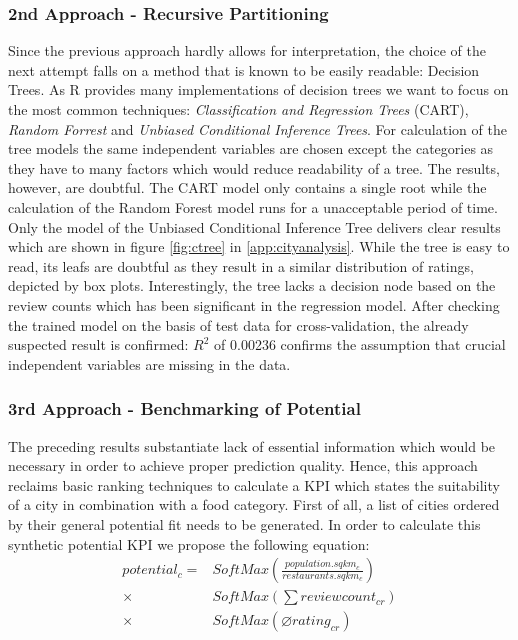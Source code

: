 \subsubsection{2nd Approach - Recursive Partitioning}
Since the previous approach hardly allows for interpretation, the choice of the next attempt falls on a method that is known to be easily readable: Decision Trees. As R provides many implementations of decision trees we want to focus on the most common techniques: \textit{Classification and Regression Trees} (CART), \textit{Random Forrest} and \textit{Unbiased Conditional Inference Trees}.\newline
For calculation of the tree models the same independent variables are chosen except the categories as they have to many factors which would reduce readability of a tree. The results, however, are doubtful. The CART model only contains a single root while the calculation of the Random Forest model runs for a unacceptable period of time. Only the model of the Unbiased Conditional Inference Tree delivers clear results which are shown in figure \ref{fig:ctree} in \ref{app:cityanalysis}.
While the tree is easy to read, its leafs are doubtful as they result in a similar distribution of ratings, depicted by box plots.
Interestingly, the tree lacks a decision node based on the review counts which has been significant in the regression model.
After checking the trained model on the basis of test data for cross-validation, the already suspected result is confirmed: $R^2$ of 0.00236 confirms the assumption that crucial independent variables are missing in the data.

\subsubsection{3rd Approach - Benchmarking of Potential}
\label{subsubsec:potential}
The preceding results substantiate lack of essential information which would be necessary in order to achieve proper prediction quality. Hence, this approach reclaims basic ranking techniques to calculate a \ac{KPI} which states the suitability of a city in combination with a food category.\newline
First of all, a list of cities ordered by their general potential fit needs to be generated. In order to calculate this synthetic potential \ac{KPI}  we propose the following equation:
\begin{equation}
\begin{aligned}
	potential_c = &SoftMax(\frac{population.sqkm_c}{restaurants.sqkm_c})  \\
	\times & SoftMax(\textstyle \sum reviewcount_{cr})  \\
	\times & SoftMax(\varnothing rating_{cr}) %
\end{aligned}
\label{eq:potential_benchmark}
\end{equation}

